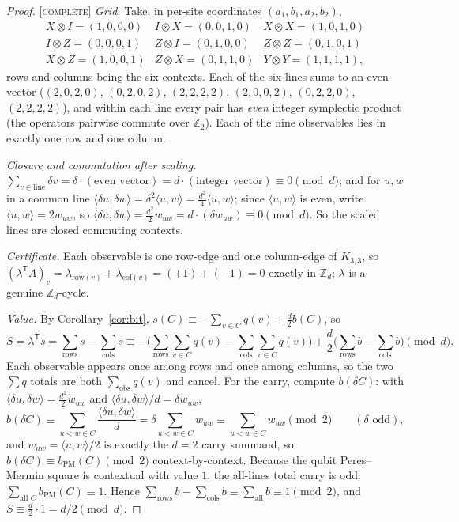 \documentclass[11pt]{article}
\theoremstyle{definition}
\theoremstyle{remark}
\newcommand{\Z}{\mathbb{Z}}
\newcommand{\Zd}{\Z_d}
\newcommand{\ip}[2]{\langle #1,#2\rangle}
\newcommand{\CO}{\textnormal{\textsc{[complete]}}}
\begin{document}
\begin{proof}
\CO{} \emph{Grid.} Take, in per-site coordinates $(a_1,b_1,a_2,b_2)$,
\[
\begin{array}{ccc}
X{\otimes}I=(1,0,0,0) & I{\otimes}X=(0,0,1,0) & X{\otimes}X=(1,0,1,0)\\
I{\otimes}Z=(0,0,0,1) & Z{\otimes}I=(0,1,0,0) & Z{\otimes}Z=(0,1,0,1)\\
X{\otimes}Z=(1,0,0,1) & Z{\otimes}X=(0,1,1,0) & Y{\otimes}Y=(1,1,1,1),
\end{array}
\]
rows and columns being the six contexts. Each of the six lines sums to an even vector
($(2,0,2,0)$, $(0,2,0,2)$, $(2,2,2,2)$, $(2,0,0,2)$, $(0,2,2,0)$, $(2,2,2,2)$), and within each line
every pair has \emph{even} integer symplectic product (the operators pairwise commute over $\Z_2$).
Each of the nine observables lies in exactly one row and one column.

\emph{Closure and commutation after scaling.} $\sum_{v\in\text{line}}\delta v=\delta\cdot(\text{even
vector})=d\cdot(\text{integer vector})\equiv0\pmod d$; and for $u,w$ in a common line
$\ip{\delta u}{\delta w}=\delta^2\ip{u}{w}=\tfrac{d^2}{4}\ip{u}{w}$; since $\ip{u}{w}$ is even, write
$\ip{u}{w}=2w_{uw}$, so $\ip{\delta u}{\delta w}=\tfrac{d^2}{2}w_{uw}=d\cdot(\delta w_{uw})\equiv0
\pmod d$. So the scaled lines are closed commuting contexts.

\emph{Certificate.} Each observable is one row-edge and one column-edge of $K_{3,3}$, so
$(\lambda^{\mathsf T}A)_v=\lambda_{\text{row}(v)}+\lambda_{\text{col}(v)}=(+1)+(-1)=0$ exactly in
$\Zd$; $\lambda$ is a genuine $\Zd$-cycle.

\emph{Value.} By Corollary~\ref{cor:bit}, $s(C)\equiv-\sum_{v\in C}q(v)+\tfrac d2b(C)$, so
\[
S=\lambda^{\mathsf T}s=\sum_{\text{rows}}s-\sum_{\text{cols}}s
\equiv-\Big(\!\sum_{\text{rows}}\!\sum_{v\in C}q(v)-\!\sum_{\text{cols}}\!\sum_{v\in C}q(v)\Big)
+\frac d2\Big(\!\sum_{\text{rows}}b-\!\sum_{\text{cols}}b\Big)\pmod d .
\]
Each observable appears once among rows and once among columns, so the two $\sum q$ totals are both
$\sum_{\text{obs}}q(v)$ and cancel. For the carry, compute $b(\delta C)$: with
$\ip{\delta u}{\delta w}=\tfrac{d^2}{2}w_{uw}$ and $\ip{\delta u}{\delta w}/d=\delta w_{uw}$,
\[
b(\delta C)\equiv\sum_{u<w\in C}\frac{\ip{\delta u}{\delta w}}{d}=\delta\sum_{u<w\in C}w_{uw}
\equiv\sum_{u<w\in C}w_{uw}\pmod2\qquad(\delta\text{ odd}),
\]
and $w_{uw}=\ip{u}{w}/2$ is exactly the $d=2$ carry summand, so $b(\delta C)\equiv b_{\mathrm{PM}}(C)
\pmod2$ context-by-context. Because the qubit Peres--Mermin square is contextual with value $1$, the
all-lines total carry is odd: $\sum_{\text{all }C}b_{\mathrm{PM}}(C)\equiv1$. Hence
$\sum_{\text{rows}}b-\sum_{\text{cols}}b\equiv\sum_{\text{all}}b\equiv1\pmod2$, and
$S\equiv\tfrac d2\cdot1=d/2\pmod d$.
\end{proof}
\end{document}
